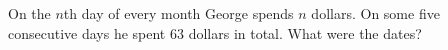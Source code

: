On the $n$th day of every month George spends $n$ dollars. On some five consecutive days he spent $63$ dollars in total. What were the dates?
